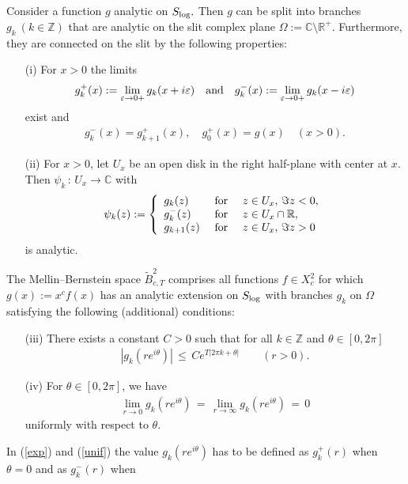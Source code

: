 \documentclass[amsmath,english,a4paper,graphicx,12pt]{article}
\newcommand{\C}{\mathbb{C}}
\newcommand{\R}{\mathbb{R}}
\begin{document}
Consider a function $g$ analytic on $S_{{\rm log}}.$ Then $g$ can be split into branches $g_k~(k \in \mathbb{Z})$ that are analytic on the slit 
complex plane $\Omega:=\C\setminus \R^+$. Furthermore, they are connected on the slit by the following properties:
\begin{enumerate}
\item[(i)] For $x>0$ the limits
$$ g_k^+(x):= \lim_{\varepsilon \rightarrow 0+} g_k(x+i\varepsilon)
\quad \hbox{and}\quad
g_k^-(x):= \lim_{\varepsilon \rightarrow 0+} g_k(x-i\varepsilon)$$
 exist and
\begin{eqnarray}\label{slit}
g_k^-(x)= g_{k+1}^+(x), \quad g_0^+(x)= g(x)
\quad (x>0).
\end{eqnarray}
\item[(ii)] For $x>0$, let $U_x$ be an open disk in the right half-plane
with center at $x$. Then $\psi_k\,:\, U_x\rightarrow \mathbb{C}$ with
\begin{eqnarray*}
 \psi_k(z):= \left\{
\begin{array}{lll}
g_k(z) & \hbox{  for } & z\in U_x, \, \Im z <0,\\
g_k^-(z) & \hbox{ for } & z\in U_x \cap\mathbb{R},\\
g_{k+1}(z) & \hbox{ for } & z\in U_x, \,  \Im z>0
\end{array}
\right.
\end{eqnarray*}
is analytic.
\end{enumerate}
The Mellin--Bernstein space $\widetilde{B}^2_{c,T}$ comprises all functions $f\in X_c^2$
for which $g(x):=x^cf(x)$ has an analytic extension on $S_{{\rm log}}$ with branches $g_k$ on $\Omega$ satisfying the following (additional) conditions:
\begin{enumerate}
\item[(iii)] There exists a constant $C>0$ such that for all $k\in\mathbb{Z}$ and
$\theta\in [0,2\pi]$
\begin{eqnarray}\label{exp}
|g_k(re^{i\theta})|\,\leq \, C e^{T|2\pi k +\theta|} \qquad (r>0).
\end{eqnarray}
\item[(iv)]
For $\theta\in [0,2\pi]$, we have
\begin{eqnarray}\label{unif}
\lim_{r\rightarrow 0} g_k(re^{i\theta})\,=\, \lim_{r\rightarrow \infty}
g_k(re^{i\theta})\,=\,0
\end{eqnarray}
uniformly with respect to $\theta$.
\end{enumerate}
In (\ref{exp}) and (\ref{unif}) the value $g_k(re^{i\theta})$ has to be
defined as $g_k^+(r)$ when $\theta=0$ and as $g_k^-(r)$ when
\end{document}

